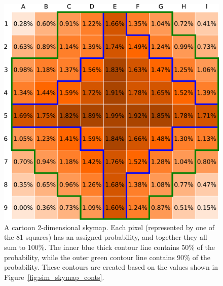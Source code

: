 \begin{colsection}
\begin{colsection}

\begin{figure}[p]
\begin{center}

\includegraphics[width=0.95\linewidth]{images/sim/sim_skymap_probs.pdf}

\end{center}

\caption[An example 2D probability skymap]{A cartoon 2-dimensional skymap. Each pixel (represented by one of the 81 squares) has an assigned probability, and together they all sum to 100\%. The inner blue thick contour line contains 50\% of the probability, while the outer green contour line contains 90\% of the probability. These contours are created based on the values shown in Figure~\ref{fig:sim_skymap_conts}.
}
\label{fig:sim_skymap_probs}
\end{figure}


\begin{figure}[p]
\begin{center}


\end{center}
\end{figure}
\end{colsection}
\end{colsection}

